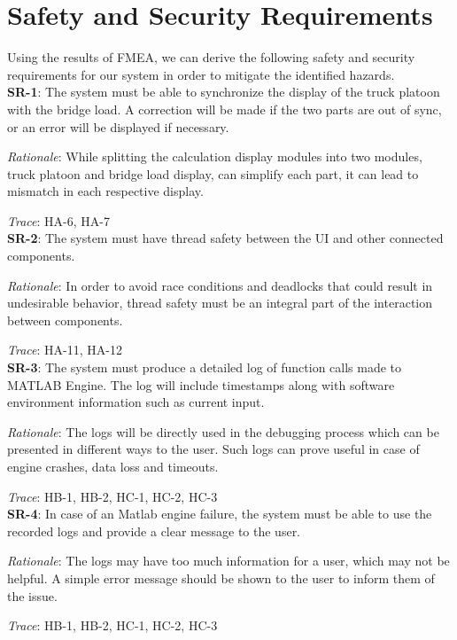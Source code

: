 \documentclass{article}
\begin{document}
\newpage

\section{Safety and Security Requirements}
Using the results of FMEA, we can derive the following safety and security requirements for our system in order to 
mitigate the identified hazards. \\

\textbf{SR-1}:
The system must be able to synchronize the display of the truck platoon with the bridge load. A correction will be
made if the two parts are out of sync, or an error will be displayed if necessary. 

\emph{Rationale}: While splitting the calculation display modules into two modules, truck platoon and bridge load 
display, can simplify each part, it can lead to mismatch in each respective display.

\emph{Trace}: HA-6, HA-7\\

\textbf{SR-2}: 
The system must have thread safety between the UI and other connected components.

\emph{Rationale}: In order to avoid race conditions and deadlocks that could result in undesirable behavior,
thread safety must be an integral part of the interaction between components.

\emph{Trace}: HA-11, HA-12 \\

\textbf{SR-3}: 
The system must produce a detailed log of function calls made to MATLAB Engine. The log will include timestamps along 
with software environment information such as current input.

\emph{Rationale}:
The logs will be directly used in the debugging process which can be presented in different ways to the user. Such logs 
can prove useful in case of engine crashes, data loss and timeouts.

\emph{Trace}: HB-1, HB-2, HC-1, HC-2, HC-3\\

\textbf{SR-4}:
In case of an Matlab engine failure, the system must be able to use the recorded logs and provide a clear message to 
the user.

\emph{Rationale}: The logs may have too much information for a user, which may not be helpful. A simple error message
should be shown to the user to inform them of the issue.

\emph{Trace}: HB-1, HB-2, HC-1, HC-2, HC-3\\
\end{document}

